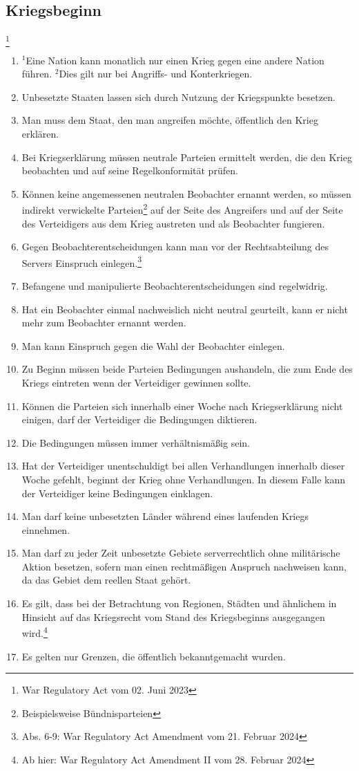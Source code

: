 \documentclass{article}
\newcommand{\sent}[1]{$^{#1}$}
\begin{document}
\subsection{Kriegsbeginn}\footnote{War Regulatory Act vom 02. Juni 2023}
\begin{enumerate}[(1)]
	\item \sent{1}Eine Nation kann monatlich nur einen Krieg gegen eine andere Nation führen. \sent{2}Dies gilt nur bei Angriffs- und Konterkriegen.
	\item Unbesetzte Staaten lassen sich durch Nutzung der Kriegspunkte besetzen.
	\item Man muss dem Staat, den man angreifen möchte, öffentlich den Krieg erklären. %
	\item Bei Kriegserklärung müssen neutrale Parteien ermittelt werden, die den Krieg beobachten und auf seine Regelkonformität prüfen.
	\item Können keine angemessenen neutralen Beobachter ernannt werden, so müssen indirekt verwickelte Parteien\footnote{Beispielsweise Bündnisparteien} auf der Seite des Angreifers und auf der Seite des Verteidigers aus dem Krieg austreten und als Beobachter fungieren.
	\item Gegen Beobachterentscheidungen kann man vor der Rechtsabteilung des Servers Einspruch einlegen.\footnote{Abs. 6-9: War Regulatory Act Amendment vom 21. Februar 2024}
	\item Befangene und manipulierte Beobachterentscheidungen sind regelwidrig.
	\item Hat ein Beobachter einmal nachweislich nicht neutral geurteilt, kann er nicht mehr zum Beobachter ernannt werden.
	\item Man kann Einspruch gegen die Wahl der Beobachter einlegen.
	\item Zu Beginn müssen beide Parteien Bedingungen aushandeln, die zum Ende des Kriegs eintreten wenn der Verteidiger gewinnen sollte. %
	\item Können die Parteien sich innerhalb einer Woche nach Kriegserklärung nicht einigen, darf der Verteidiger die Bedingungen diktieren.
	\item Die Bedingungen müssen immer verhältnismäßig sein.
	\item Hat der Verteidiger unentschuldigt bei allen Verhandlungen innerhalb dieser Woche gefehlt, beginnt der Krieg ohne Verhandlungen. In diesem Falle kann der Verteidiger keine Bedingungen einklagen.
	\item Man darf keine unbesetzten Länder während eines laufenden Kriegs einnehmen.
	\item Man darf zu jeder Zeit unbesetzte Gebiete serverrechtlich ohne militärische Aktion besetzen, sofern man einen rechtmäßigen Anspruch nachweisen kann, da das Gebiet dem reellen Staat gehört.
	\item Es gilt, dass bei der Betrachtung von Regionen, Städten und ähnlichem in Hinsicht auf das Kriegsrecht vom Stand des Kriegsbeginns ausgegangen wird.\footnote{Ab hier: War Regulatory Act Amendment II vom 28. Februar 2024}
	\item Es gelten nur Grenzen, die öffentlich bekanntgemacht wurden.
\end{enumerate}
\end{document}
